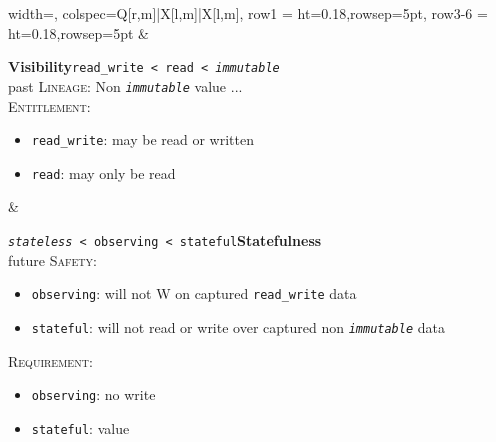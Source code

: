 \documentclass{article}
\begin{document}
\begin{center}
\begin{tblr}{
  width=\textwidth, %
  colspec={Q[r,m]|X[l,m]|X[l,m]},
  row{1}   = {ht=0.18\textheight,rowsep=5pt},
  row{3-6} = {ht=0.18\textheight,rowsep=5pt}
}
& {
\begin{minipage}[c][0.18\textheight][s]{\linewidth}
  {\large\bfseries Visibility}\hfill{\small\texttt{read\_write < read < \textit{immutable}}}\\
  {\footnotesize past}
  \vfill
  \textsc{Lineage}: Non \texttt{\textit{immutable}} value ... \\
  \textsc{Entitlement}:
  \begin{itemize}
    \item\texttt{read\_write}: may be read or written
    \item\texttt{read}: may only be read
  \end{itemize}
\end{minipage}
} & {
\begin{minipage}[c][0.18\textheight][s]{\linewidth}
  {\small\texttt{\textit{stateless} < observing < stateful}}\hfill{\large\bfseries Statefulness}\\
  {\footnotesize\null\hfill future}
  \vfill
  \textsc{Safety}:
  \begin{itemize}
    \item\texttt{observing}: will not W on captured \texttt{read\_write} data
    \item\texttt{stateful}: will not read or write over captured non \texttt{\textit{immutable}} data
  \end{itemize}
  \textsc{Requirement}:
  \begin{itemize}
    \item\texttt{observing}: no write
    \item\texttt{stateful}: value 
  \end{itemize}
\end{minipage}
}

\end{tblr}
\end{center} %
\end{document}
